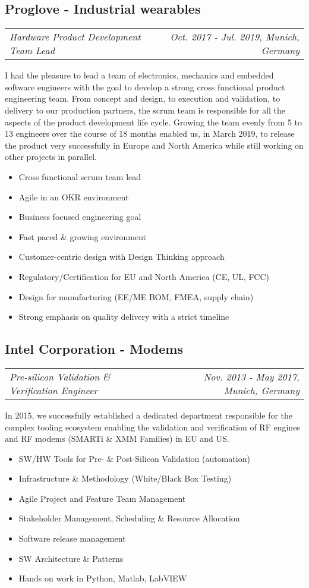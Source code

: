 \documentclass[10pt,a4paper]{moderncv}
\newcommand*{\experienceentry}[5][5mm]{
    \subsection{#2}
    \begin{tabularx}{\textwidth}{LR}
        {\itshape #3} & {\itshape #4, #5}
    \end{tabularx}
    \par\addvspace{#1}
}
\begin{document}
\experienceentry{Proglove - Industrial wearables}{Hardware Product Development Team Lead}{Oct. 2017 - Jul. 2019}{Munich, Germany}

    I had the pleasure to lead a team of electronics, mechanics and embedded software engineers with the goal to develop a strong cross functional product engineering team. From concept and design, to execution and validation, to delivery to our production partners, the scrum team is responsible for all the aspects of the product development life cycle. Growing the team evenly from 5 to 13 engineers over the course of 18 months enabled us, in March 2019, to release the product very successfully in Europe and North America while still working on other projects in parallel.


    \begin{itemize}
        \item Cross functional scrum team lead
        \item Agile in an OKR environment
        \item Business focused engineering goal
        \item Fast paced \& growing environment
        \item Customer-centric design with Design Thinking approach
        \item Regulatory/Certification for EU and North America (CE, UL, FCC)
        \item Design for manufacturing (EE/ME BOM, FMEA, supply chain) 
        \item Strong emphasis on quality delivery with a strict timeline
    \end{itemize}

\vspace{5mm}

\experienceentry{Intel Corporation - Modems}{Pre-silicon Validation \& Verification Engineer}{Nov. 2013 - May 2017}{Munich, Germany}

    In 2015, we successfully established a dedicated department responsible for the complex tooling ecosystem enabling the validation and verification of RF engines and RF modems (SMARTi \& XMM Families) in EU and US.

    \vspace{2.0mm}

    \begin{itemize}
        \item SW/HW Tools for Pre- \& Post-Silicon Validation (automation)
        \item Infrastructure \& Methodology (White/Black Box Testing) 
        \item Agile Project and Feature Team Management
        \item Stakeholder Management, Scheduling \& Resource Allocation 
        \item Software release management
        \item SW Architecture \& Patterns
        \item Hands on work in Python, Matlab, LabVIEW
    \end{itemize}
\end{document}
